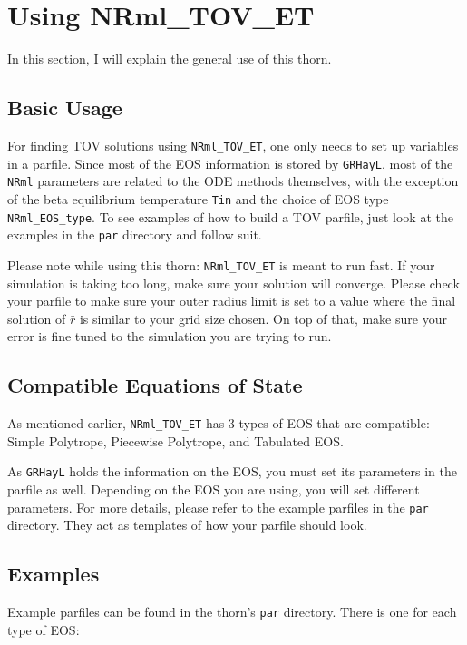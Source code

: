 \section{Using NRml\_TOV\_ET}

In this section, I will explain the general use of this thorn. 

\subsection{Basic Usage}

For finding TOV solutions using {\tt NRml\_TOV\_ET}, one only needs to set up variables in a parfile. Since most of the EOS information is stored by {\tt GRHayL}, most of the {\tt NRml} parameters are related to the ODE methods themselves, with the exception of the beta equilibrium temperature {\tt Tin} and the choice of EOS type {\tt NRml\_EOS\_type}. To see examples of how to build a TOV parfile, just look at the examples in the {\tt par} directory and follow suit.

Please note while using this thorn: {\tt NRml\_TOV\_ET} is meant to run fast. If your simulation is taking too long, make sure your solution will converge. Please check your parfile to make sure your outer radius limit is set to a value where the final solution of $\bar{r}$ is similar to your grid size chosen. On top of that, make sure your error is fine tuned to the simulation you are trying to run.

\subsection{Compatible Equations of State}

As mentioned earlier, {\tt NRml\_TOV\_ET} has 3 types of EOS that are compatible: Simple Polytrope, Piecewise Polytrope, and Tabulated EOS.

As {\tt GRHayL}\cite{GRHayL} holds the information on the EOS, you must set its parameters in the parfile as well. Depending on the EOS you are using, you will set different parameters. For more details, please refer to the example parfiles in the {\tt par} directory. They act as templates of how your parfile should look.

\subsection{Examples}

Example parfiles can be found in the thorn's {\tt par} directory. There is one for each type of EOS:

